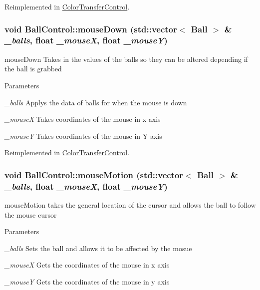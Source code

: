 Reimplemented in \hyperlink{classColorTransferControl_ab4db8c5f585065d55e4beaef3d51b940}{ColorTransferControl}.\hypertarget{classBallControl_a1ba25b7c58a9a6ec39ca54daa9e1f488}{
\subsubsection[{mouseDown}]{\setlength{\rightskip}{0pt plus 5cm}void BallControl::mouseDown (std::vector$<$ {\bf Ball} $>$ \& {\em \_\-balls}, \/  float {\em \_\-mouseX}, \/  float {\em \_\-mouseY})}}
\label{classBallControl_a1ba25b7c58a9a6ec39ca54daa9e1f488}


mouseDown Takes in the values of the balls so they can be altered depending if the ball is grabbed 
\begin{DoxyParams}{Parameters}
\item[{\em \_\-balls}]Applys the data of balls for when the mouse is down \item[{\em \_\-mouseX}]Takes coordinates of the mouse in x axis \item[{\em \_\-mouseY}]Takes coordinates of the mouse in Y axis \end{DoxyParams}


Reimplemented in \hyperlink{classColorTransferControl_ac0acd46f1620035c8d7a830206fce6b8}{ColorTransferControl}.\hypertarget{classBallControl_a18a2fcfe219f8f28319d8f9dcb2bee77}{
\subsubsection[{mouseMotion}]{\setlength{\rightskip}{0pt plus 5cm}void BallControl::mouseMotion (std::vector$<$ {\bf Ball} $>$ \& {\em \_\-balls}, \/  float {\em \_\-mouseX}, \/  float {\em \_\-mouseY})}}
\label{classBallControl_a18a2fcfe219f8f28319d8f9dcb2bee77}


mouseMotion takes the general location of the cursor and allows the ball to follow the mouse cursor 
\begin{DoxyParams}{Parameters}
\item[{\em \_\-balls}]Sets the ball and allows it to be affected by the mosue \item[{\em \_\-mouseX}]Gets the coordinates of the mouse in x axis \item[{\em \_\-mouseY}]Gets the coordinates of the mouse in y axis \end{DoxyParams}


